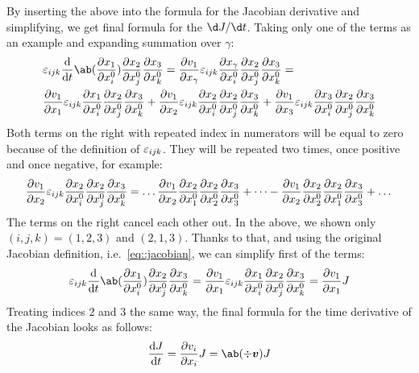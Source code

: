\documentclass[justified, nobib,a4paper]{tufte-handout}
\begin{document}
By inserting the above into the formula for the Jacobian derivative 
and simplifying, we get final formula for the \(\d  J/\d  t\).
Taking only one of the terms as an example and expanding summation 
over \(\gamma\):
\begin{equation*}
  \begin{split}
    & \levicivita{i}{j}{k} \odv{}{t} \ab( \pdv{x_1}{x^0_i} ) 
      \pdv{x_2}{x^0_j} \pdv{x_3}{x^0_k}
    = \pdv{v_1}{x_\gamma} \levicivita{i}{j}{k} \pdv{x_\gamma}{x^0_i}\pdv{x_2}{x^0_j}
      \pdv{x_3}{x^0_k} =\\
    & \pdv{v_1}{x_1} \levicivita{i}{j}{k} \pdv{x_1}{x^0_i}\pdv{x_2}{x^0_j} \pdv{x_3}{x^0_k} + 
    \pdv{v_1}{x_2} \levicivita{i}{j}{k} \pdv{x_2}{x^0_i}\pdv{x_2}{x^0_j} \pdv{x_3}{x^0_k} +
    \pdv{v_1}{x_3} \levicivita{i}{j}{k} \pdv{x_3}{x^0_i}\pdv{x_2}{x^0_j} \pdv{x_3}{x^0_k}
  \end{split}
\end{equation*}
Both terms on the right with repeated index in numerators will be equal to 
zero because of the definition of \(\varepsilon_{{i}{j}{k}}\). They will be 
repeated two times, once positive and once negative, for example:
\[
  \pdv{v_1}{x_2} \varepsilon_{{i}{j}{k}} 
  \pdv{x_2}{x^0_i}\pdv{x_2}{x^0_j} \pdv{x_3}{x^0_k} = \dots
  \pdv{v_1}{x_2} 
  \pdv{x_2}{x^0_1}\pdv{x_2}{x^0_2} \pdv{x_3}{x^0_3} + \dots 
  - \pdv{v_1}{x_2} 
  \pdv{x_2}{x^0_2}\pdv{x_2}{x^0_1} \pdv{x_3}{x^0_3} + \dots
\]
The terms on the right cancel each other out. In the above, we shown only 
\((i,j,k) = (1,2,3)\) and \((2,1,3)\).
Thanks to that, and using the original Jacobian definition, 
i.e.~\autoref{eq::jacobian}, we can simplify first of the terms: 
\begin{equation*}
  \levicivita{i}{j}{k} \odv{}{t} \ab( \pdv{x_1}{x^0_i} ) \pdv{x_2}{x^0_j} 
  \pdv{x_3}{x^0_k}
  = \pdv{v_1}{x_1} \levicivita{i}{j}{k} \pdv{x_1}{x^0_i}\pdv{x_2}{x^0_j} 
  \pdv{x_3}{x^0_k}
  = \pdv{v_1}{x_1} J
\end{equation*}
Treating indices \(2\) and \(3\) the same way, the final formula for the 
time derivative of the Jacobian looks as follows:
\begin{equation}
  \odv{J}{t}  = \pdv{v_i}{x_i} J = \ab(\div\vec{v})J
  \label{eq::ddt_J}
\end{equation}
\end{document}
